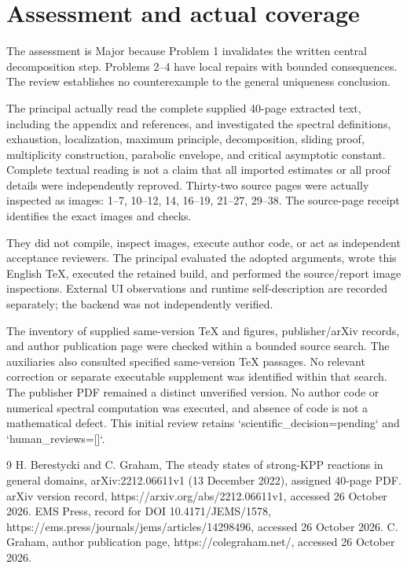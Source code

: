 \documentclass[10pt]{article}
\begin{document}
\section*{Assessment and actual coverage}
The assessment is Major because Problem 1 invalidates the written central decomposition step. Problems 2–4 have local repairs with bounded consequences. The review establishes no counterexample to the general uniqueness conclusion.\par
The principal actually read the complete supplied 40-page extracted text, including the appendix and references, and investigated the spectral definitions, exhaustion, localization, maximum principle, decomposition, sliding proof, multiplicity construction, parabolic envelope, and critical asymptotic constant. Complete textual reading is not a claim that all imported estimates or all proof details were independently reproved. Thirty-two source pages were actually inspected as images: 1–7, 10–12, 14, 16–19, 21–27, 29–38. The source-page receipt identifies the exact images and checks.\par
They did not compile, inspect images, execute author code, or act as independent acceptance reviewers. The principal evaluated the adopted arguments, wrote this English TeX, executed the retained build, and performed the source/report image inspections. External UI observations and runtime self-description are recorded separately; the backend was not independently verified.\par
The inventory of supplied same-version TeX and figures, publisher/arXiv records, and author publication page were checked within a bounded source search. The auxiliaries also consulted specified same-version TeX passages. No relevant correction or separate executable supplement was identified within that search. The publisher PDF remained a distinct unverified version. No author code or numerical spectral computation was executed, and absence of code is not a mathematical defect. This initial review retains `scientific\_decision=pending` and `human\_reviews=[]`.\par
9 H. Berestycki and C. Graham, The steady states of strong-KPP reactions in general domains, arXiv:2212.06611v1 (13 December 2022), assigned 40-page PDF. arXiv version record, https://arxiv.org/abs/2212.06611v1, accessed 26 October 2026. EMS Press, record for DOI 10.4171/JEMS/1578, https://ems.press/journals/jems/articles/14298496, accessed 26 October 2026. C. Graham, author publication page, https://colegraham.net/, accessed 26 October 2026.\par
\end{document}
